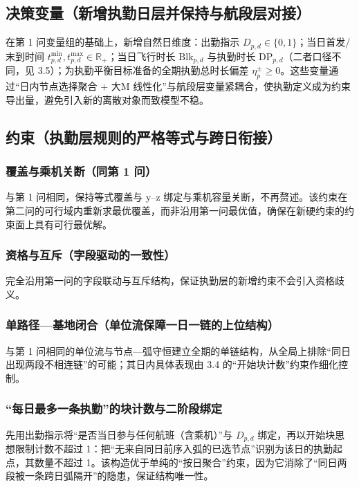 \documentclass{article}
\begin{document}
\subsection{决策变量（新增执勤日层并保持与航段层对接）}
在第 1 问变量组的基础上，新增自然日维度：出勤指示 $D_{p,d} \in \{0,1\}$；当日首发/末到时间 $t^{\min}_{p,d}, t^{\max}_{p,d} \in \mathbb{R}_+$；当日飞行时长 $\mathrm{Blk}_{p,d}$ 与执勤时长 $\mathrm{DP}_{p,d}$（二者口径不同，见 3.5）；为执勤平衡目标准备的全期执勤总时长偏差 $\eta_p^{\pm} \ge 0$。这些变量通过“日内节点选择聚合 + 大M 线性化”与航段层变量紧耦合，使执勤定义成为约束导出量，避免引入新的离散对象而致模型不稳。

\subsection{约束（执勤层规则的严格等式与跨日衔接）}

\subsubsection{覆盖与乘机关断（同第 1 问）}
与第 1 问相同，保持等式覆盖与 y–z 绑定与乘机容量关断，不再赘述。该约束在第二问的可行域内重新求最优覆盖，而非沿用第一问最优值，确保在新硬约束的约束面上具有可行最优解。

\subsubsection{资格与互斥（字段驱动的一致性）}
完全沿用第一问的字段联动与互斥结构，保证执勤层的新增约束不会引入资格歧义。

\subsubsection{单路径—基地闭合（单位流保障一日一链的上位结构）}
与第 1 问相同的单位流与节点—弧守恒建立全期的单链结构，从全局上排除“同日出现两段不相连链”的可能；其日内具体表现由 3.4 的“开始块计数”约束作细化控制。

\subsubsection{“每日最多一条执勤”的块计数与二阶段绑定}
先用出勤指示将“是否当日参与任何航班（含乘机）”与 $D_{p,d}$ 绑定，再以开始块思想限制计数不超过 1：把“无来自同日前序入弧的已选节点”识别为该日的执勤起点，其数量不超过 1。该构造优于单纯的“按日聚合”约束，因为它消除了“同日两段被一条跨日弧隔开”的隐患，保证结构唯一性。
\end{document}
